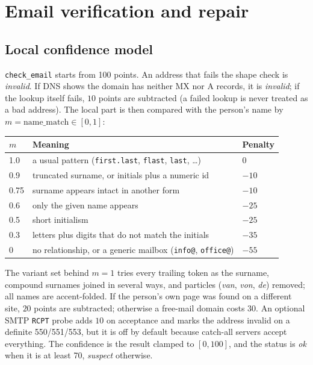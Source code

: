 \documentclass[11pt,a4paper]{article}
\newcommand{\code}[1]{\texttt{#1}}
\begin{document}
\section{Email verification and repair}\label{sec:verify}

\subsection{Local confidence model}
\code{check\_email} starts from 100 points. An address that fails the shape check is
\emph{invalid}. If DNS shows the domain has neither MX nor A records, it is \emph{invalid}; if
the lookup itself fails, $10$ points are subtracted (a failed lookup is never treated as a bad
address). The local part is then compared with the person's name by $m = \text{name\_match} \in
[0,1]$:

\begin{center}
\begin{tabular}{@{}lll@{}}
\toprule
$m$ & Meaning & Penalty \\
\midrule
1.0 & a usual pattern (\code{first.last}, \code{flast}, \code{last}, \ldots) & 0 \\
0.9 & truncated surname, or initials plus a numeric id & $-10$ \\
0.75 & surname appears intact in another form & $-10$ \\
0.6 & only the given name appears & $-25$ \\
0.5 & short initialism & $-25$ \\
0.3 & letters plus digits that do not match the initials & $-35$ \\
0 & no relationship, or a generic mailbox (\code{info@}, \code{office@}) & $-55$ \\
\bottomrule
\end{tabular}
\end{center}

\noindent The variant set behind $m=1$ tries every trailing token as the surname, compound
surnames joined in several ways, and particles (\emph{van}, \emph{von}, \emph{de}) removed; all
names are accent-folded. If the person's own page was found on a different site, $20$ points are
subtracted; otherwise a free-mail domain costs $30$. An optional SMTP \code{RCPT} probe adds $10$
on acceptance and marks the address invalid on a definite 550/551/553, but it is off by default
because catch-all servers accept everything. The confidence is the result clamped to
$[0, 100]$, and the status is \emph{ok} when it is at least 70, \emph{suspect} otherwise.
\end{document}
